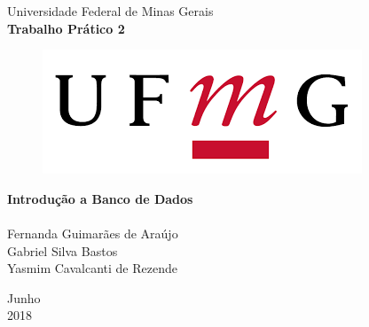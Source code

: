 \documentclass{article}
\begin{document}

\begin{titlepage}
  \begin{center}
    
    \Huge{Universidade Federal de Minas Gerais}\\     
    \vspace{15pt}
    \vspace{95pt}
    \textbf{\LARGE{Trabalho Prático 2}}\\
    \vspace{3,5cm}
    \begin{figure}[h]
      \begin{center}
        \includegraphics[scale = 0.50]{ufmg.png}
      \end{center}
     \label{fig:graph}
    \end{figure}
        
  \end{center}
  
  \begin{flushleft}
    \begin{tabbing}
      \textbf {Introdução a Banco de Dados}\\
      \\
        Fernanda Guimarães de Araújo\\
        Gabriel Silva Bastos\\
        Yasmim Cavalcanti de Rezende
      \end{tabbing}
  \end{flushleft}
  
    \vspace{1cm} 
  \begin{center}
    \vspace{\fill}
    Junho\\
    2018
  \end{center}
\end{titlepage}
\end{document}
